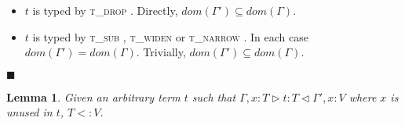 \documentclass[preprint]{sigplanconf}
\newtheorem{lem}{Lemma}
\newcommand{\tdrop}{\textsc{t\_drop} }
\newcommand{\tsub}{\textsc{t\_sub} }
\newcommand{\tnarrow}{\textsc{t\_narrow} }
\newcommand{\twiden}{\textsc{t\_widen} }
\newcommand{\typerule}[4]{#1 \triangleright #2 : #3 \triangleleft #4}
\newcommand{\qed}{$\blacksquare$}
\newenvironment{proof}{\vspace{1ex}\noindent{\bf Proof}\hspace{0.5em}}
  {\hfill\qed\vspace{1ex}}
\begin{document}
\begin{proof}
\begin{itemize}
\item $t$ is typed by \tdrop. Directly, $dom(\Gamma') \subseteq dom(\Gamma)$.

\item $t$ is typed by \tsub, \twiden or \tnarrow. In each case
$dom(\Gamma') = dom(\Gamma)$. Trivially, $dom(\Gamma') \subseteq dom(\Gamma)$.

\end{itemize}
\end{proof}


\begin{lem}
\label{lem:unused}
Given an arbitrary term $t$ such that 
$\typerule{\Gamma, x : T}{t}{T}{\Gamma', x : V}$ where $x$ is unused in
$t$, $T <: V$.
\end{lem}


\end{document}
